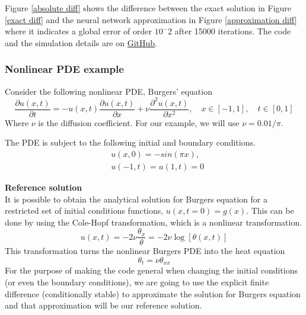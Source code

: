 \documentclass[a4paper,12pt]{article}
\theoremstyle{definition}
\begin{document}
Figure \ref{absolute diff} shows the difference between the exact solution 
in Figure \ref{exact diff} and the neural network approximation in Figure \ref{approximation diff}
where it indicates a global error of order $10^-2$ after 15000 iterations. The code and the simulation
details are on \href{https://github.com/HashimAlSadah/MX-Project/blob/main/PINN/continuous_time_model/PDE_diffusion_PINN.ipynb}
{GitHub}.

\subsubsection{Nonlinear PDE example}
Consider the following nonlinear PDE, Burgers' equation
\begin{equation}
\frac{\partial u(x,t)}{\partial t} 
= -u(x,t)\frac{\partial u(x,t)}{\partial x} 
+ \nu \frac{\partial^2 u(x,t)}{\partial x^2}, \quad x \in [-1, 1], \quad t \in [0, 1]
\end{equation}
Where $\nu$ is the diffusion coefficient. For our example, we will use $\nu = 0.01 / \pi$.

The PDE is subject to the following initial and boundary conditions.
\begin{equation}
\begin{aligned}
&u(x, 0) = -sin(\pi x), \\
&u(-1, t) = u(1, t) = 0
\end{aligned}
\end{equation}

\textbf{Reference solution}\\
It is possible to obtain the analytical solution for Burgers equation for a 
restricted set of initial conditions functions, $u(x,t=0) = g(x)$. This can be done by 
using the Cole-Hopf transformation, which is a nonlinear transformation\cite{kutluay1999numerical}.
\begin{equation}
u(x, t) = -2 \nu \frac{\theta_x}{\theta} = -2 \nu \log[\theta(x,t)]
\end{equation}
This transformation turns the nonlinear Burgers PDE into the heat equation
\begin{equation}
\theta_t = \nu \theta_{xx}
\end{equation}
For the purpose of making the code general when changing the initial conditions (or even the boundary conditions), 
we are going to use the explicit finite difference (conditionally stable) to approximate the solution for 
Burgers equation and that approximation will be our reference solution.
\end{document}
